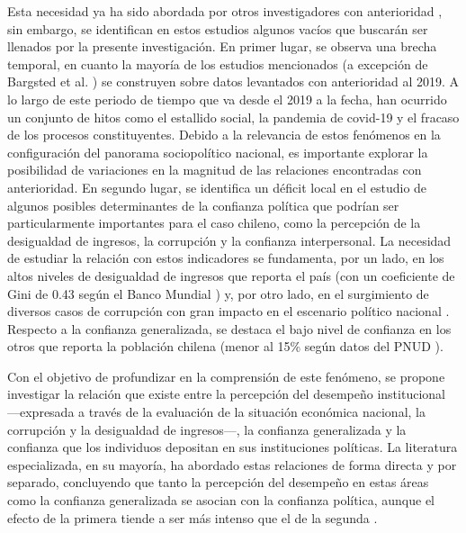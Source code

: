 \documentclass[12pt,twoside]{templates/facsothesis}
\begin{document}
Esta necesidad ya ha sido abordada por otros investigadores con anterioridad \citep[véase][]{bargstedSocialPoliticalTrust2023, moralesquirogaEvaluandoConfianzaInstitucional2008, riffoQueInfluyeConfianza2019, saldanazunigaConfianzaInstitucionesPoliticas2019, segoviaMalaiseDemocracyChile2016, segoviaConfianzaInstitucionesPoliticas2008}, sin embargo, se identifican en estos estudios algunos vacíos que buscarán ser llenados por la presente investigación. En primer lugar, se observa una brecha temporal, en cuanto la mayoría de los estudios mencionados (a excepción de Bargsted et al. \citeyearpar{bargstedSocialPoliticalTrust2023}) se construyen sobre datos levantados con anterioridad al 2019. A lo largo de este periodo de tiempo que va desde el 2019 a la fecha, han ocurrido un conjunto de hitos como el estallido social, la pandemia de covid-19 y el fracaso de los procesos constituyentes. Debido a la relevancia de estos fenómenos en la configuración del panorama sociopolítico nacional, es importante explorar la posibilidad de variaciones en la magnitud de las relaciones encontradas con anterioridad. En segundo lugar, se identifica un déficit local en el estudio de algunos posibles determinantes de la confianza política que podrían ser particularmente importantes para el caso chileno, como la percepción de la desigualdad de ingresos, la corrupción y la confianza interpersonal. La necesidad de estudiar la relación con estos indicadores se fundamenta, por un lado, en los altos niveles de desigualdad de ingresos que reporta el país (con un coeficiente de Gini de 0.43 según el Banco Mundial \citeyearpar{bancomundialIndicadoresDesarrolloMundial2023}) y, por otro lado, en el surgimiento de diversos casos de corrupción con gran impacto en el escenario político nacional \citep{avendanoPropuestasCambioDebilidad2021}. Respecto a la confianza generalizada, se destaca el bajo nivel de confianza en los otros que reporta la población chilena (menor al 15\% según datos del PNUD \citeyearpar{pnudInformeSobreDesarrollo2024}).

Con el objetivo de profundizar en la comprensión de este fenómeno, se propone investigar la relación que existe entre la percepción del desempeño institucional ---expresada a través de la evaluación de la situación económica nacional, la corrupción y la desigualdad de ingresos---, la confianza generalizada y la confianza que los individuos depositan en sus instituciones políticas. La literatura especializada, en su mayoría, ha abordado estas relaciones de forma directa y por separado, concluyendo que tanto la percepción del desempeño en estas áreas como la confianza generalizada se asocian con la confianza política, aunque el efecto de la primera tiende a ser más intenso que el de la segunda \citep{mainwaringStateDeficienciesParty2006, mattesSocialPoliticalTrust2018, morrisCorruptionTrustTheoretical2010, newtonSocialPoliticalTrust2017}.
\end{document}
